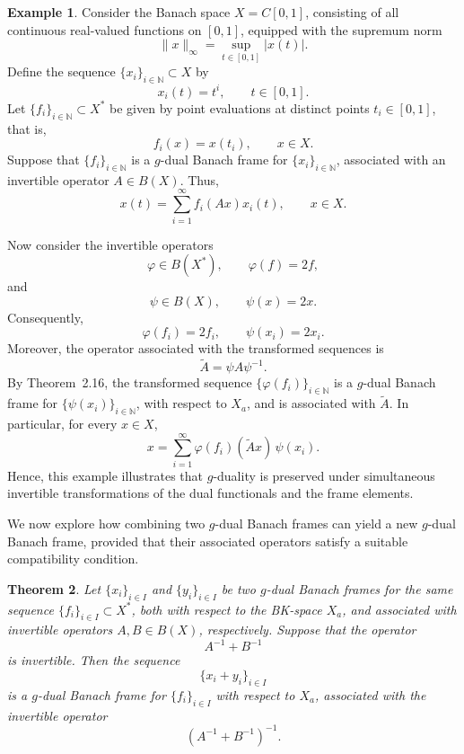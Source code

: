 \documentclass[12pt]{article}
\newtheorem{theorem}{Theorem}[section]
\theoremstyle{definition}
\newtheorem{example}[theorem]{Example}
\theoremstyle{remark}
\begin{document}
\begin{example}
Consider the Banach space \(X=C[0,1]\), consisting of all continuous
real-valued functions on \([0,1]\), equipped with the supremum norm
\[
\|x\|_\infty=\sup_{t\in[0,1]}|x(t)|.
\]
Define the sequence \(\{x_i\}_{i\in\mathbb{N}}\subset X\) by
\[
x_i(t)=t^i,\qquad t\in[0,1].
\]
Let \(\{f_i\}_{i\in\mathbb{N}}\subset X^*\) be given by point evaluations
at distinct points \(t_i\in[0,1]\), that is,
\[
f_i(x)=x(t_i),\qquad x\in X.
\]
Suppose that \(\{f_i\}_{i\in\mathbb{N}}\) is a \(g\)-dual Banach frame
for \(\{x_i\}_{i\in\mathbb{N}}\), associated with an invertible operator
\(A\in B(X)\). Thus,
\[
x(t)=\sum_{i=1}^{\infty}f_i(Ax)x_i(t),
\qquad x\in X.
\]

Now consider the invertible operators
\[
\varphi\in B(X^*),\qquad \varphi(f)=2f,
\]
and
\[
\psi\in B(X),\qquad \psi(x)=2x.
\]
Consequently,
\[
\varphi(f_i)=2f_i,
\qquad
\psi(x_i)=2x_i.
\]
Moreover, the operator associated with the transformed sequences is
\[
\widetilde{A}=\psi A\psi^{-1}.
\]
By Theorem~2.16, the transformed sequence
\(\{\varphi(f_i)\}_{i\in\mathbb{N}}\) is a \(g\)-dual Banach frame
for \(\{\psi(x_i)\}_{i\in\mathbb{N}}\), with respect to \(X_a\), and is
associated with \(\widetilde{A}\). In particular, for every \(x\in X\),
\[
x
=
\sum_{i=1}^{\infty}
\varphi(f_i)(\widetilde{A}x)\,\psi(x_i).
\]
Hence, this example illustrates that \(g\)-duality is preserved under
simultaneous invertible transformations of the dual functionals and
the frame elements.
\end{example}
\noindent
We now explore how combining two \(g\)-dual Banach frames can yield a new \(g\)-dual Banach frame, provided that their associated operators satisfy a suitable compatibility condition.

\begin{theorem}
	Let \(\{x_i\}_{i\in I}\) and \(\{y_i\}_{i\in I}\) be two \(g\)-dual Banach frames for the same sequence
	\(\{f_i\}_{i\in I}\subset X^*\), both with respect to the BK-space \(X_a\), and associated with invertible operators
	\(A,B\in B(X)\), respectively. Suppose that the operator
	\[
	A^{-1}+B^{-1}
	\]
	is invertible. Then the sequence
	\[
	\{x_i+y_i\}_{i\in I}
	\]
	is a \(g\)-dual Banach frame for \(\{f_i\}_{i\in I}\) with respect to \(X_a\), associated with the invertible operator
	\[
	\left(A^{-1}+B^{-1}\right)^{-1}.
	\]
\end{theorem}
\end{document}
